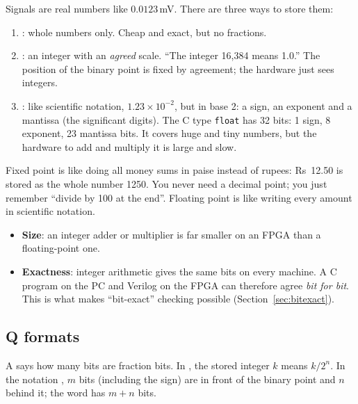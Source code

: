 \documentclass[11pt]{article}
\begin{document}
Signals are real numbers like $0.0123$\,mV. There are three ways to store them:

\begin{enumerate}
  \item {}: whole numbers only. Cheap and exact, but no fractions.
  \item {}: an integer with an \emph{agreed} scale. ``The integer 16,384 means 1.0.'' The position of the binary point is fixed by agreement; the hardware just sees integers.
  \item {}: like scientific notation, $1.23 \times 10^{-2}$, but in base 2: a sign, an exponent and a mantissa (the significant digits). The C type \texttt{float} has 32 bits: 1 sign, 8 exponent, 23 mantissa bits. It covers huge and tiny numbers, but the hardware to add and multiply it is large and slow.
\end{enumerate}

\begin{analogy}
Fixed point is like doing all money sums in paise instead of rupees: Rs~12.50 is stored as the whole number 1250. You never need a decimal point; you just remember ``divide by 100 at the end''. Floating point is like writing every amount in scientific notation.
\end{analogy}

\begin{simple}
\begin{itemize}
  \item \textbf{Size}: an integer adder or multiplier is far smaller on an FPGA than a floating-point one.
  \item \textbf{Exactness}: integer arithmetic gives the same bits on every machine. A C program on the PC and Verilog on the FPGA can therefore agree \emph{bit for bit}. This is what makes ``bit-exact'' checking possible (Section~\ref{sec:bitexact}).
\end{itemize}
\end{simple}

\subsection{Q formats}
\label{sec:q}

A  says how many bits are fraction bits. In , the stored integer $k$ means $k/2^n$. In the notation , $m$ bits (including the sign) are in front of the binary point and $n$ behind it; the word has $m+n$ bits.
\end{document}
